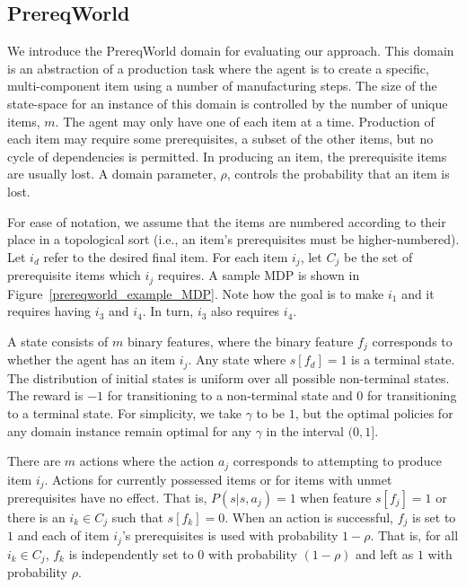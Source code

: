 \documentclass[letterpaper]{article} %
\begin{document}
\subsection{PrereqWorld} \label{em_prereqworld}

We introduce the PrereqWorld domain for evaluating our approach. 
This domain is an abstraction of a production task where the agent is to create a specific, multi-component item using a number of manufacturing steps. 
The size of the state-space for an instance of this domain is controlled by the number of unique items, $m$. 
The agent may only have one of each item at a time.
Production of each item may require some prerequisites, a subset of the other items, but no cycle of dependencies is permitted. 
In producing an item, the prerequisite items are usually lost. 
A domain parameter, $\rho$, controls the probability that an item is lost. 

For ease of notation, we assume that the items are numbered according to their place in a topological sort (i.e., an item's prerequisites must be higher-numbered). 
Let $i_d$ refer to the desired final item. 
For each item $i_j$, let $C_j$ be the set of prerequisite items which $i_j$ requires. 
A sample MDP is shown in Figure~\ref{prereqworld_example_MDP}. 
Note how the goal is to make $i_1$ and it requires having $i_3$ and $i_4$. In turn, $i_3$ also requires $i_4$.

A state consists of $m$ binary features, where the binary feature $f_j$ corresponds to whether the agent has an item $i_j$. 
Any state where $s[f_d]=1$ is a terminal state. 
The distribution of initial states is uniform over all possible non-terminal states. 
The reward is $-1$ for transitioning to a non-terminal state and $0$ for transitioning to a terminal state. 
For simplicity, we take $\gamma$ to be $1$, but the optimal policies for any domain instance remain optimal for any $\gamma$ in the interval $(0,1]$.

There are $m$ actions where the action $a_j$ corresponds to attempting to produce item $i_j$. 
Actions for currently possessed items or for items with unmet prerequisites have no effect. 
That is, $P(s | s, a_j) = 1$ when feature $s[f_j] = 1$ or there is an $i_k \in C_j$ such that $s[f_k] = 0$. 
When an action is successful, $f_j$ is set to $1$ and each of item $i_j$'s prerequisites is used with probability $1-\rho$. That is, for all $i_k \in C_j$, $f_k$ is independently set to $0$ with probability $(1-\rho)$ and left as $1$ with probability $\rho$. 

\end{document}
